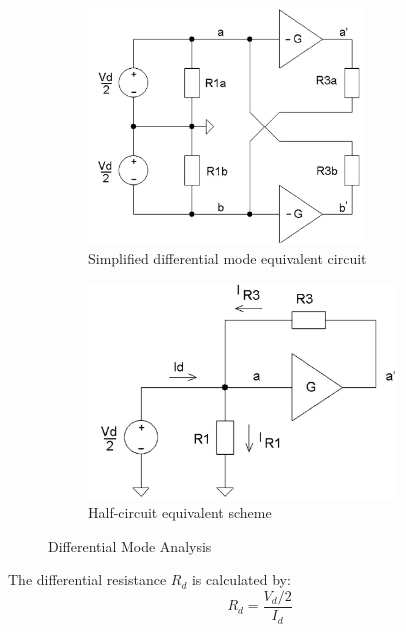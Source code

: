 \begin{itemize}
\begin{figure}[h]
	\centering
	\begin{subfigure}{0.5\textwidth}
		\centering
		\includegraphics[width=0.8\textwidth]{images/diff_simplified}
		\caption{Simplified differential mode equivalent circuit}
		\label{fig:differential_mode}
	\end{subfigure}
	\hfill
	\begin{subfigure}{0.4\textwidth}
		\centering
		\includegraphics[width=0.9\textwidth]{images/diff_half}
		\caption{Half-circuit equivalent scheme}
		\label{fig:half_circuit_equivalent}
	\end{subfigure}
	\caption{Differential Mode Analysis}
	\label{fig:differential_analysis}
\end{figure}

The differential resistance \(R_d\) is calculated by:
\begin{equation}
	R_d = \frac{V_d / 2}{I_d}
	\label{eq:diff_resistance}
\end{equation}


\end{itemize}
